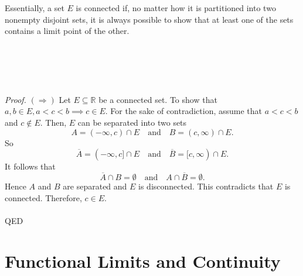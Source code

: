 \documentclass{article}
\begin{document}
            Essentially, a set $E$ is connected if, no matter how it is partitioned into two nonempty disjoint sets, it is always possible to show that at least one of the sets contains a limit point of the other.
            \\ \\
            \\ \\
            \\ \\
            \textit{Proof.} $(\Rightarrow)$ Let $E \subseteq \mathbb{R}$ be a connected set. To show that $a,b \in E, a<c<b \implies c \in E$. For the sake of contradiction, assume that $a<c<b$ and $c \notin E$. Then, $E$ can be separated into two sets
            \begin{equation*}
                A = (-\infty,c) \cap E \quad \text{and} \quad B = (c,\infty) \cap E.
            \end{equation*}
            So
            \begin{equation*}
                \overline{A} = (-\infty,c] \cap E \quad \text{and} \quad \overline{B} = [c,\infty) \cap E.
            \end{equation*}
            It follows that
            \begin{equation*}
                \overline{A} \cap B = \emptyset \quad \text{and} \quad A \cap \overline{B} = \emptyset.
            \end{equation*}
            Hence $A$ and $B$ are separated and $E$ is disconnected. This contradicts that $E$ is connected. Therefore, $c \in E$.
            \\ \\
            QED
            
            \section{Functional Limits and Continuity}
\end{document}
